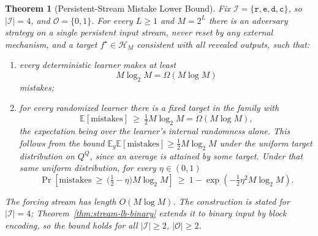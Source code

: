 \documentclass[12pt]{article}
\newtheorem{theorem}{Theorem}[section]
\theoremstyle{definition}
\begin{document}
\begin{theorem}[Persistent-Stream Mistake Lower Bound]
\label{thm:stream-lower-bound}
Fix $\mathcal I=\{\mathtt r,\mathtt e,\mathtt d,\mathtt c\}$, so
$|\mathcal I|=4$, and $\mathcal O=\{0,1\}$.  For every $L\ge1$ and $M=2^L$
there is an adversary strategy on a \emph{single persistent input stream},
never reset by any external mechanism, and a target
$f^\star\in\mathcal H_M$ consistent with all revealed outputs, such that:
\begin{enumerate}[label=(\roman*)]
\item every \emph{deterministic} learner makes at least
\[
M\log_2M=\Omega(M\log M)
\]
mistakes;
\item for every \emph{randomized} learner there is a fixed target in the
family with
\[
\mathbb E[\text{mistakes}]
\ \ge\
\tfrac12 M\log_2M
=
\Omega(M\log M),
\]
the expectation being over the learner's internal randomness alone.  This
follows from the bound $\mathbb E_{g}\mathbb E[\text{mistakes}]\ge\tfrac12
M\log_2M$ under the uniform target distribution on $Q^Q$, since an average is
attained by some target.  Under that same uniform distribution, for every
$\eta\in(0,1)$
\[
\Pr\left[
\text{mistakes}\ \ge\ \bigl(\tfrac12-\eta\bigr)M\log_2M
\right]
\ \ge\
1-\exp\!\left(-\tfrac12\eta^2M\log_2M\right).
\]
\end{enumerate}
The forcing stream has length $O(M\log M)$.  The construction is stated for
$|\mathcal I|=4$; Theorem~\ref{thm:stream-lb-binary} extends it to binary
input by block encoding, so the bound holds for all
$|\mathcal I|\ge2$, $|\mathcal O|\ge2$.
\end{theorem}
\end{document}
